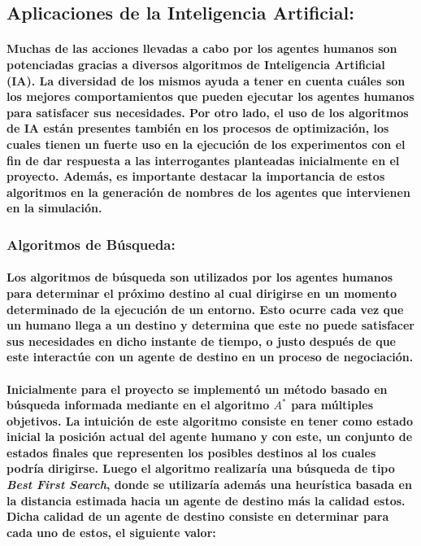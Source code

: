 \documentclass[12pt]{amsart}
\begin{document}
\subsection{Aplicaciones de la Inteligencia Artificial:}

\paragraph{Muchas de las acciones llevadas a cabo por los agentes humanos son potenciadas gracias a diversos algoritmos de Inteligencia Artificial (IA). La diversidad de los mismos ayuda a tener en cuenta cuáles son los mejores comportamientos que pueden ejecutar los agentes humanos para satisfacer sus necesidades. Por otro lado, el uso de los algoritmos de IA están presentes también en los procesos de optimización, los cuales tienen un fuerte uso en la ejecución de los experimentos con el fin de dar respuesta a las interrogantes planteadas inicialmente en el proyecto. Además, es importante destacar la importancia de estos algoritmos en la generación de nombres de los agentes que intervienen en la simulación.}

\subsubsection{Algoritmos de Búsqueda:}

\paragraph{Los algoritmos de búsqueda son utilizados por los agentes humanos para determinar el próximo destino al cual dirigirse en un momento determinado de la ejecución de un entorno. Esto ocurre cada vez que un humano llega a un destino y determina que este no puede satisfacer sus necesidades en dicho instante de tiempo, o justo después de que este interactúe con un agente de destino en un proceso de negociación.}

\paragraph{Inicialmente para el proyecto se implementó un método basado en búsqueda informada mediante en el algoritmo $A^*$ para múltiples objetivos. La intuición de este algoritmo consiste en tener como estado inicial la posición actual del agente humano y con este, un conjunto de estados finales que representen los posibles destinos al los cuales podría dirigirse. Luego el algoritmo realizaría una búsqueda de tipo \textit{Best First Search}, donde se utilizaría además una heurística basada en la distancia estimada hacia un agente de destino más la calidad estos. Dicha calidad de un agente de destino consiste en determinar para cada uno de estos, el siguiente valor:}
\end{document}
